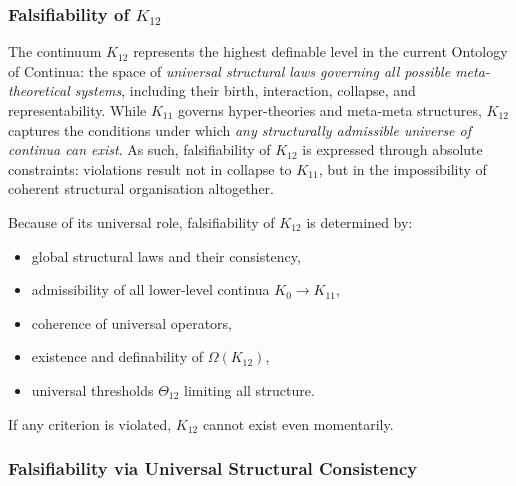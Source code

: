 
\subsubsection{Falsifiability of $K_{12}$}
\label{sec:falsifiability-k12}

The continuum $K_{12}$ represents the highest definable level in the
current Ontology of Continua: the space of \emph{universal structural
laws governing all possible meta-theoretical systems}, including their
birth, interaction, collapse, and representability. While $K_{11}$
governs hyper-theories and meta-meta structures, $K_{12}$ captures the
conditions under which \emph{any structurally admissible universe of
continua can exist}. As such, falsifiability of $K_{12}$ is expressed
through absolute constraints: violations result not in collapse to
$K_{11}$, but in the impossibility of coherent structural organisation
altogether.

Because of its universal role, falsifiability of $K_{12}$ is determined
by:

\begin{itemize}
    \item global structural laws and their consistency,
    \item admissibility of all lower-level continua $K_0 \to K_{11}$,
    \item coherence of universal operators,
    \item existence and definability of $\Omega(K_{12})$,
    \item universal thresholds $\Theta_{12}$ limiting all structure.
\end{itemize}

If any criterion is violated, $K_{12}$ cannot exist even momentarily.



\subsubsection{Falsifiability via Universal Structural Consistency}

